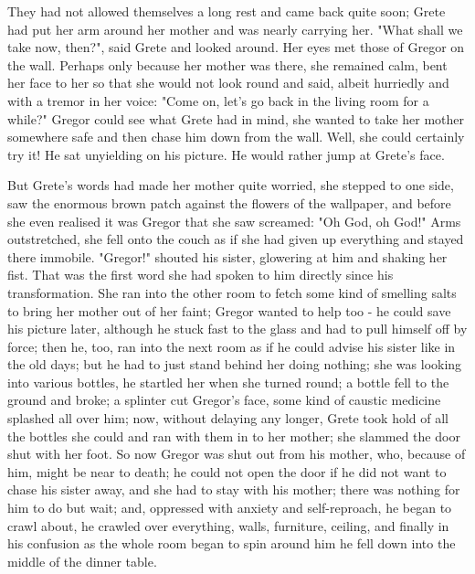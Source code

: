 \documentclass[12pt]{book}
\begin{document}
    They had not allowed themselves a long rest and came back quite soon; Grete had put her arm around her mother and was nearly carrying her. "What shall we take now, then?", said Grete and looked around. Her eyes met those of Gregor on the wall. Perhaps only because her mother was there, she remained calm, bent her face to her so that she would not look round and said, albeit hurriedly and with a tremor in her voice: "Come on, let's go back in the living room for a while?" Gregor could see what Grete had in mind, she wanted to take her mother somewhere safe and then chase him down from the wall. Well, she could certainly try it! He sat unyielding on his picture. He would rather jump at Grete's face.

    But Grete's words had made her mother quite worried, she stepped to one side, saw the enormous brown patch against the flowers of the wallpaper, and before she even realised it was Gregor that she saw screamed: "Oh God, oh God!" Arms outstretched, she fell onto the couch as if she had given up everything and stayed there immobile. "Gregor!" shouted his sister, glowering at him and shaking her fist. That was the first word she had spoken to him directly since his transformation. She ran into the other room to fetch some kind of smelling salts to bring her mother out of her faint; Gregor wanted to help too - he could save his picture later, although he stuck fast to the glass and had to pull himself off by force; then he, too, ran into the next room as if he could advise his sister like in the old days; but he had to just stand behind her doing nothing; she was looking into various bottles, he startled her when she turned round; a bottle fell to the ground and broke; a splinter cut Gregor's face, some kind of caustic medicine splashed all over him; now, without delaying any longer, Grete took hold of all the bottles she could and ran with them in to her mother; she slammed the door shut with her foot. So now Gregor was shut out from his mother, who, because of him, might be near to death; he could not open the door if he did not want to chase his sister away, and she had to stay with his mother; there was nothing for him to do but wait; and, oppressed with anxiety and self-reproach, he began to crawl about, he crawled over everything, walls, furniture, ceiling, and finally in his confusion as the whole room began to spin around him he fell down into the middle of the dinner table.
\end{document}
